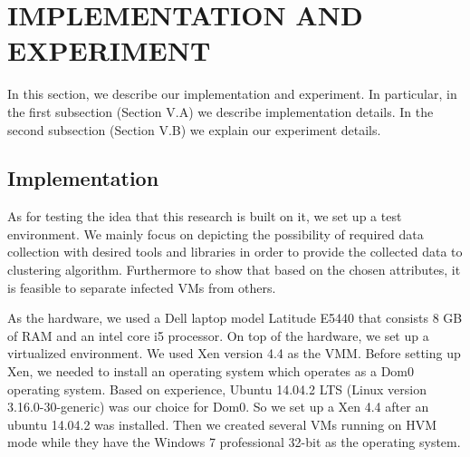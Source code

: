 \documentclass[conference]{IEEEtran}
\begin{document}
\section{IMPLEMENTATION AND EXPERIMENT}
In this section, we describe our implementation and experiment. In particular, in the first subsection (Section V.A) we describe implementation details. In the second subsection (Section V.B) we explain our experiment details.
\subsection{Implementation}
As for testing the idea that this research is built on it, we set up a test environment. We mainly focus on depicting the possibility of required data collection with desired tools and libraries in order to provide the collected data to clustering algorithm. Furthermore to show that based on the chosen attributes, it is feasible to separate infected VMs from others. 

As the hardware, we used a Dell laptop model Latitude E5440 that consists 8 GB of RAM and an intel core i5 processor. On top of the hardware, we set up a virtualized environment. We used Xen version 4.4 as the VMM. Before setting up Xen, we needed to install an operating system which operates as a Dom0 operating system. Based on experience, Ubuntu 14.04.2 LTS (Linux version 3.16.0-30-generic) was our choice for Dom0. So we set up a Xen 4.4 after an ubuntu 14.04.2 was installed. Then we created several VMs running on HVM mode while they have the Windows 7 professional 32-bit as the operating system. 
\end{document}
